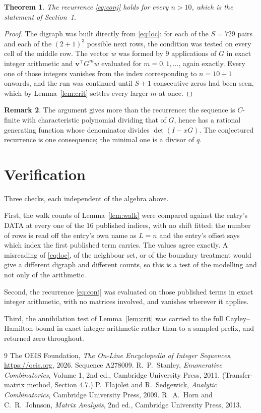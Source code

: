 \documentclass[11pt,a4paper]{article}
\theoremstyle{plain}
\newtheorem{theorem}{Theorem}
\theoremstyle{definition}
\newtheorem{remark}[theorem]{Remark}
\begin{document}
\begin{theorem}
The recurrence \eqref{eq:conj} holds for every $n>10$, which is the statement of
Section~1.
\end{theorem}

\begin{proof}
The digraph was built directly from \eqref{eq:loc}: for each of the $S=729$ pairs and each
of the $(2+1)^{3}$ possible next rows, the condition was tested on every cell of
the middle row. The vector $w$ was formed by $9$ applications of $G$ in exact integer
arithmetic and $\mathbf{v}^{\!\top}G^{m}w$ evaluated for $m=0,1,\dots$, again exactly.
Every one of those integers vanishes from the index corresponding to $n=10+1$ onwards,
and the run was continued until $S+1$ consecutive zeros had been seen, which by
Lemma~\ref{lem:crit} settles every larger $m$ at once.
\end{proof}

\begin{remark}
The argument gives more than the recurrence: the sequence is $C$-finite with characteristic
polynomial dividing that of $G$, hence has a rational generating function whose denominator
divides $\det(I-xG)$. The conjectured recurrence is one consequence; the minimal one is a
divisor of $q$.
\end{remark}

\section{Verification}

Three checks, each independent of the algebra above.

First, the walk counts of Lemma~\ref{lem:walk} were compared against the entry's DATA at
every one of the $16$ published indices, with no shift fitted: the number of rows is
read off the entry's own name as $L=n$ and the entry's offset says which index the first
published term carries. The values agree exactly. A misreading of \eqref{eq:loc}, of the
neighbour set, or of the boundary treatment would give a different digraph and different
counts, so this is a test of the modelling and not only of the arithmetic.

Second, the recurrence \eqref{eq:conj} was evaluated on those published terms in exact
integer arithmetic, with no matrices involved, and vanishes wherever it applies.

Third, the annihilation test of Lemma~\ref{lem:crit} was carried to the full
Cayley--Hamilton bound in exact integer arithmetic rather than to a sampled prefix, and
returned zero throughout.

\begin{thebibliography}{9}
 The OEIS Foundation, \emph{The On-Line Encyclopedia of Integer
Sequences}, \url{https://oeis.org}, 2026. Sequence A278009.
 R.~P.~Stanley, \emph{Enumerative Combinatorics}, Volume 1, 2nd ed.,
Cambridge University Press, 2011. (Transfer-matrix method, Section 4.7.)
 P.~Flajolet and R.~Sedgewick, \emph{Analytic Combinatorics}, Cambridge
University Press, 2009.
 R.~A.~Horn and C.~R.~Johnson, \emph{Matrix Analysis}, 2nd ed., Cambridge
University Press, 2013.
\end{thebibliography}
\end{document}
